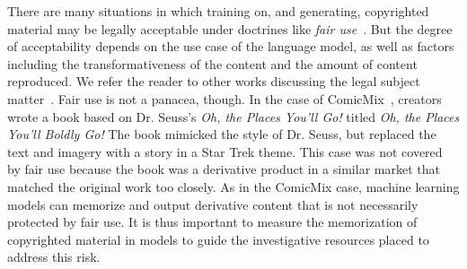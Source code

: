 There are many situations in which training on, and generating, copyrighted material may be legally acceptable under doctrines like \emph{fair use}~\citep{lemley2020fair}. 
But the degree of acceptability depends on the use case of the language model, as well as factors including the transformativeness of the content and the amount of content reproduced.
We refer the reader to other works discussing the legal subject matter~\citep{sobel2017artificial,lemley2020fair,burk2019algorithmic,gillotte2019copyright,franceschelli2022copyright}.
Fair use is not a panacea, though.
In the case of ComicMix~\citep{comicmix}, creators wrote a book based on Dr. Seuss's \emph{Oh, the Places You’ll Go!} titled \emph{Oh, the Places You’ll Boldly Go!}
The book mimicked the style of Dr. Seuss, but replaced the text and imagery with a story in a Star Trek theme. 
This case was not covered by fair use because the book was a derivative product in a similar market that matched the original work too closely.
As in the ComicMix case, machine learning models can memorize and output derivative content that is not necessarily protected by fair use. 
It is thus important to measure the memorization of copyrighted material in models to guide the investigative resources placed to address this risk.

